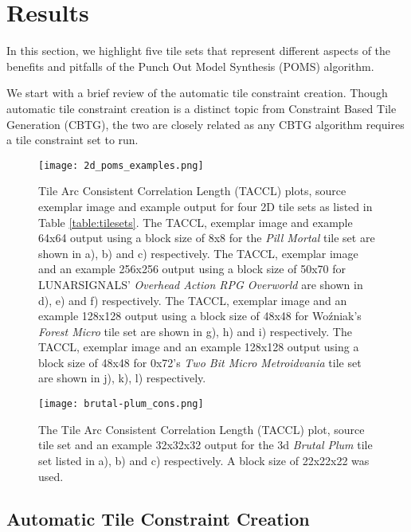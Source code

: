 \section{Results}

In this section, we highlight five tile sets that represent different aspects of the
benefits and pitfalls of the Punch Out Model Synthesis (POMS) algorithm.

We start with a brief review of the automatic tile constraint creation.
Though automatic tile constraint creation is a distinct topic from Constraint Based
Tile Generation (CBTG), the two are closely related as any CBTG algorithm requires
a tile constraint set to run.

\begin{figure*}[ht]
  \texttt{[image: 2d\_poms\_examples.png]}
  \caption{Tile Arc Consistent Correlation Length (TACCL) plots, source exemplar image and example output for four 2D tile sets as listed in Table \ref{table:tilesets}.
           The TACCL, exemplar image and example 64x64 output using a block size of 8x8 for the \textit{Pill Mortal} tile set are shown in a), b) and c) respectively. The TACCL, exemplar image and an example 256x256 output using a block size of 50x70 for LUNARSIGNALS' \textit{Overhead Action RPG Overworld} are shown in d), e) and f) respectively. The TACCL, exemplar image and an example 128x128 output using a block size of 48x48 for Wo\'zniak's \textit{Forest Micro} tile set are shown in g), h) and i) respectively. The TACCL, exemplar image and an example 128x128 output using a block size of 48x48 for 0x72's \textit{Two Bit Micro Metroidvania} tile set are shown in j), k), l) respectively. }
  \label{fig:2dexamples}
\end{figure*}

\begin{figure}[h]
  \centering
  \texttt{[image: brutal-plum\_cons.png]}
  \caption{The Tile Arc Consistent Correlation Length (TACCL) plot, source tile set and an example 32x32x32 output for the 3d \textit{Brutal Plum} tile set listed in a), b) and c) respectively. A block size of 22x22x22 was used.}
  \label{fig:brutal_plum}
\end{figure}

\subsection{Automatic Tile Constraint Creation}

